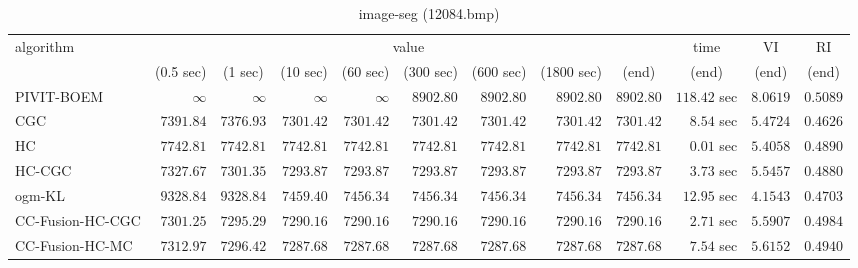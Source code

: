 \begin{table}[H]
\scriptsize
\centering
\caption{image-seg (12084.bmp)}
\label{tab:anytimetable-image-seg-12084.bmp}
\begin{tabular}{lrrrrrrrrrrr}
\toprule
           algorithm &                                   \multicolumn{8}{c}{value} & \multicolumn{1}{c}{time}    & \multicolumn{1}{c}{VI}  & \multicolumn{1}{c}{RI} \\  
\cmidrule(lr){2-9}\cmidrule(lr){10-10} \cmidrule(lr){11-11} \cmidrule(lr){12-12}   
                     & \multicolumn{1}{c}{(0.5 sec)} & \multicolumn{1}{c}{(1 sec)} & \multicolumn{1}{c}{(10 sec)} & \multicolumn{1}{c}{(60 sec)} & \multicolumn{1}{c}{(300 sec)} & \multicolumn{1}{c}{(600 sec)} & \multicolumn{1}{c}{(1800 sec)} & \multicolumn{1}{c}{(end)} & \multicolumn{1}{c}{(end)}    & \multicolumn{1}{c}{(end)}   & \multicolumn{1}{c}{(end)}  \\ \midrule 
          PIVIT-BOEM & $\infty$ & $\infty$ & $\infty$ & $\infty$ & $      8902.80$ & $      8902.80$ & $      8902.80$ & $      8902.80$ & $       118.42$ sec    & $       8.0619$  & $       0.5089$ \\ 
                 CGC & $      7391.84$ & $      7376.93$ & $      7301.42$ & $      7301.42$ & $      7301.42$ & $      7301.42$ & $      7301.42$ & $      7301.42$ & $         8.54$ sec    & $       5.4724$  & $       0.4626$ \\ 
                  HC & $      7742.81$ & $      7742.81$ & $      7742.81$ & $      7742.81$ & $      7742.81$ & $      7742.81$ & $      7742.81$ & $      7742.81$ & $         0.01$ sec    & $       5.4058$  & $       0.4890$ \\ 
              HC-CGC & $      7327.67$ & $      7301.35$ & $      7293.87$ & $      7293.87$ & $      7293.87$ & $      7293.87$ & $      7293.87$ & $      7293.87$ & $         3.73$ sec    & $       5.5457$  & $       0.4880$ \\ 
              ogm-KL & $      9328.84$ & $      9328.84$ & $      7459.40$ & $      7456.34$ & $      7456.34$ & $      7456.34$ & $      7456.34$ & $      7456.34$ & $        12.95$ sec    & $       4.1543$  & $       0.4703$ \\ 
    CC-Fusion-HC-CGC & $      7301.25$ & $      7295.29$ & $      7290.16$ & $      7290.16$ & $      7290.16$ & $      7290.16$ & $      7290.16$ & $      7290.16$ & $         2.71$ sec    & $       5.5907$  & $       0.4984$ \\ 
     CC-Fusion-HC-MC & $      7312.97$ & $      7296.42$ & $      7287.68$ & $      7287.68$ & $      7287.68$ & $      7287.68$ & $      7287.68$ & $      7287.68$ & $         7.54$ sec    & $       5.6152$  & $       0.4940$ \\ 

\end{tabular}
\end{table}
